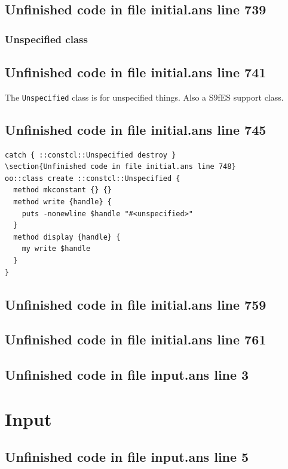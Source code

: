 \documentclass[twoside,9pt]{report}
\begin{document}
\section{Unfinished code in file initial.ans line 739}
\subsection{Unspecified class}
\label{unspecified-class}
\section{Unfinished code in file initial.ans line 741}


The \texttt{Unspecified} class is for unspecified things. Also a S9fES support class.

\section{Unfinished code in file initial.ans line 745}
\begin{lstlisting}
catch { ::constcl::Unspecified destroy }
\section{Unfinished code in file initial.ans line 748}
oo::class create ::constcl::Unspecified {
  method mkconstant {} {}
  method write {handle} {
    puts -nonewline $handle "#<unspecified>"
  }
  method display {handle} {
    my write $handle
  }
}
\end{lstlisting}
\section{Unfinished code in file initial.ans line 759}
\section{Unfinished code in file initial.ans line 761}
\section{Unfinished code in file input.ans line 3}
\chapter{Input}
\label{input}
\section{Unfinished code in file input.ans line 5}
\end{document}
